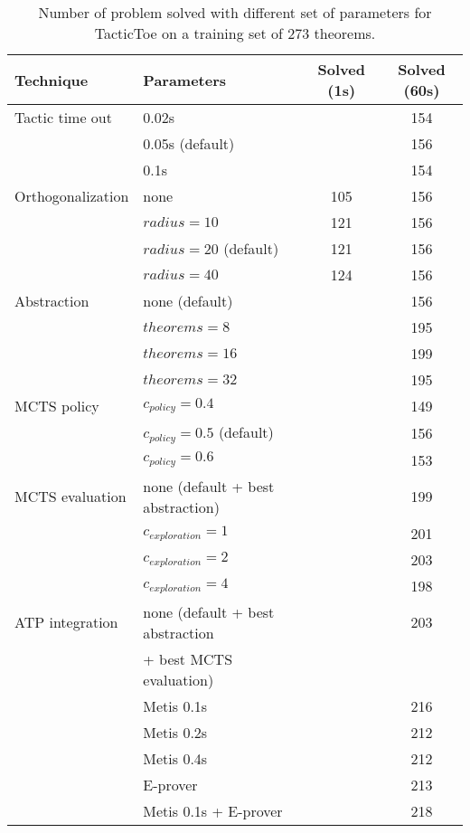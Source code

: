 \documentclass[runningheads,a4paper,draft]{svjour3}
\def\eprover{\textsf{E-prover}\xspace}
\def\metis{\textsf{Metis}\xspace}
\def\tactictoe{\textsf{TacticToe}\xspace}
\newcommand{\ra}[1]{\renewcommand{\arraystretch}{#1}}
\begin{document}
\begin{table}[ht]
\centering\ra{1.3}
\small
\begin{tabular}{llcc}
\toprule
 Technique & Parameters & Solved (1s) & Solved (60s)\\
\midrule
Tactic time out & 0.02s && 154\\
                & 0.05s (default) && 156\\
                & 0.1s && 154\\
\midrule
Orthogonalization & none & 105 & 156 \\
                  & $radius = 10$ & 121 & 156 \\
                  & $radius = 20$ (default) & 121 & 156 \\
                  & $radius = 40$ & 124 & 156 \\
\midrule
Abstraction       & none (default)  && 156\\
                  & $theorems = 8$  && 195\\
                  & $theorems = 16$ && 199\\
                  & $theorems = 32$ && 195\\
\midrule
MCTS policy & $c_{policy} = 0.4$ && 149\\
            & $c_{policy} = 0.5$ (default) && 156\\
            & $c_{policy} = 0.6$ && 153\\
\midrule
MCTS evaluation & none (default + best abstraction) && 199\\
				& $c_{exploration} = 1$ && 201\\
				& $c_{exploration} = 2$ && 203\\
				& $c_{exploration} = 4$ && 198\\
\midrule
ATP integration & none (default + best abstraction && 203\\
                &  + best MCTS evaluation) &&\\
                & \metis 0.1s && 216\\
                & \metis 0.2s && 212\\
                & \metis 0.4s && 212\\
                & \eprover && 213\\
                & \metis 0.1s + \eprover && 218\\
\bottomrule
\end{tabular}
\caption{\label{tab:tuning} Number of problem solved with different set of
parameters for \tactictoe on a training set of 273 theorems.}
\end{table}
\end{document}
